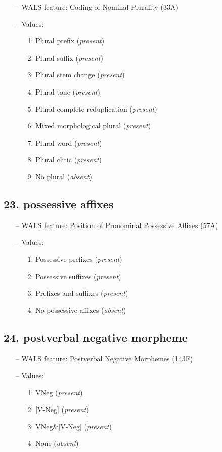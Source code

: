 \begin{itemize}
  \item[--] WALS feature: Coding of Nominal Plurality (33A)
  \item[--] Values:
  {\small
  \begin{enumerate}
    \item[1:] Plural prefix (\emph{present})
    \item[2:] Plural suffix (\emph{present})
    \item[3:] Plural stem change (\emph{present})
    \item[4:] Plural tone (\emph{present})
    \item[5:] Plural complete reduplication (\emph{present})
    \item[6:] Mixed morphological plural (\emph{present})
    \item[7:] Plural word (\emph{present})
    \item[8:] Plural clitic (\emph{present})
    \item[9:] No plural (\emph{absent})
  \end{enumerate}
  }
\end{itemize}


\subsection*{23. possessive affixes}

\begin{itemize}
  \item[--] WALS feature: Position of Pronominal Possessive Affixes (57A)
  \item[--] Values:
  {\small
  \begin{enumerate}
    \item[1:] Possessive prefixes (\emph{present})
    \item[2:] Possessive suffixes (\emph{present})
    \item[3:] Prefixes and suffixes (\emph{present})
    \item[4:] No possessive affixes (\emph{absent})
  \end{enumerate}
  }
\end{itemize}


\subsection*{24. postverbal negative morpheme}

\begin{itemize}
  \item[--] WALS feature: Postverbal Negative Morphemes (143F)
  \item[--] Values:
  {\small
  \begin{enumerate}
    \item[1:] VNeg (\emph{present})
    \item[2:] [V-Neg] (\emph{present})
    \item[3:] VNeg\&[V-Neg] (\emph{present})
    \item[4:] None (\emph{absent})
  \end{enumerate}
  }
\end{itemize}


